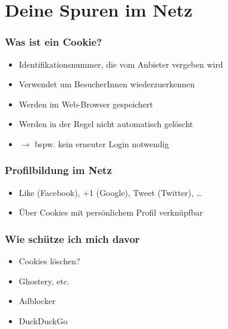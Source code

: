 \section{Deine Spuren im Netz}


\begin{frame}
\frametitle{Was ist ein Cookie?}

\begin{itemize}
  \item Identifikationsnummer, die vom Anbieter vergeben wird
  \item Verwendet um BesucherInnen wiederzuerkennen
  \item Werden im Web-Browser gespeichert
  \item Werden in der Regel nicht automatisch gelöscht
  \item $\rightarrow$ bspw. kein erneuter Login notwendig
\end{itemize}

\end{frame}

\begin{frame}
\frametitle{Profilbildung im Netz}

\begin{itemize}
  \item Like (Facebook), +1 (Google), Tweet (Twitter), \dots
  \item Über Cookies mit persönlichem Profil verknüpfbar
\end{itemize}

\end{frame}

\begin{frame}
  \frametitle{Wie schütze ich mich davor}
  \begin{itemize}
    \item Cookies löschen?
    \item Ghostery, etc.
    \item Adblocker
    \item DuckDuckGo
  \end{itemize}
\end{frame}


